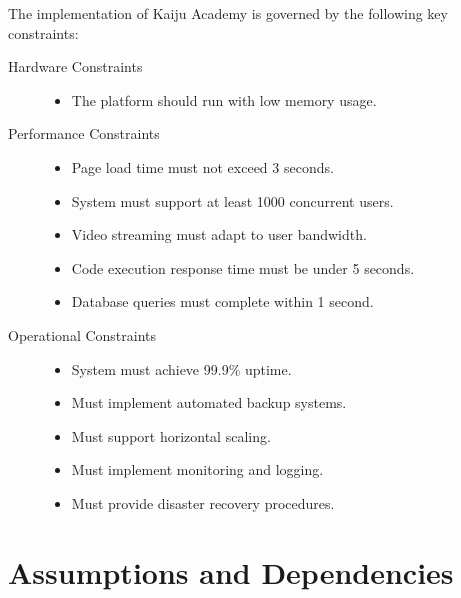 \documentclass[a4paper, 11pt]{scrreprt}
\begin{document}
The implementation of Kaiju Academy is governed by the following key constraints:

\begin{description}
    \item[Hardware Constraints]\mbox{}
        \begin{itemize}
            \item The platform should run with low memory usage.
        \end{itemize}
    \item[Performance Constraints]\mbox{}
        \begin{itemize}
            \item Page load time must not exceed 3 seconds.
            \item System must support at least 1000 concurrent users.
            \item Video streaming must adapt to user bandwidth.
            \item Code execution response time must be under 5 seconds.
            \item Database queries must complete within 1 second.
        \end{itemize}
    \item[Operational Constraints]\mbox{}
        \begin{itemize}
            \item System must achieve 99.9\% uptime.
            \item Must implement automated backup systems.
            \item Must support horizontal scaling.
            \item Must implement monitoring and logging.
            \item Must provide disaster recovery procedures.
        \end{itemize}
\end{description}

\section{Assumptions and Dependencies}
\end{document}
